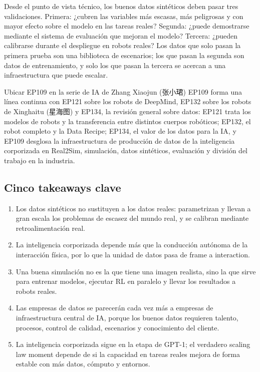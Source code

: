 \documentclass[a4paper]{article}
\begin{document}
Desde el punto de vista técnico, los buenos datos sintéticos deben pasar tres validaciones. Primera: ¿cubren las variables más escasas, más peligrosas y con mayor efecto sobre el modelo en las tareas reales? Segunda: ¿puede demostrarse mediante el sistema de evaluación que mejoran el modelo? Tercera: ¿pueden calibrarse durante el despliegue en robots reales? Los datos que solo pasan la primera prueba son una biblioteca de escenarios; los que pasan la segunda son datos de entrenamiento, y solo los que pasan la tercera se acercan a una infraestructura que puede escalar.

\begin{importantbox}{Ubicar EP109 en la serie de IA de Zhang Xiaojun (张小珺)}
EP109 forma una línea continua con EP121 sobre los robots de DeepMind, EP132 sobre los robots de Xinghaitu (星海图) y EP134, la revisión general sobre datos: EP121 trata los modelos de robots y la transferencia entre distintos cuerpos robóticos; EP132, el robot completo y la Data Recipe; EP134, el valor de los datos para la IA, y EP109 desglosa la infraestructura de producción de datos de la inteligencia corporizada en Real2Sim, simulación, datos sintéticos, evaluación y división del trabajo en la industria.
\end{importantbox}

\subsection{Cinco takeaways clave}

\begin{enumerate}
\item Los datos sintéticos no sustituyen a los datos reales: parametrizan y llevan a gran escala los problemas de escasez del mundo real, y se calibran mediante retroalimentación real.
\item La inteligencia corporizada depende más que la conducción autónoma de la interacción física, por lo que la unidad de datos pasa de frame a interaction.
\item Una buena simulación no es la que tiene una imagen realista, sino la que sirve para entrenar modelos, ejecutar RL en paralelo y llevar los resultados a robots reales.
\item Las empresas de datos se parecerán cada vez más a empresas de infraestructura central de IA, porque los buenos datos requieren talento, procesos, control de calidad, escenarios y conocimiento del cliente.
\item La inteligencia corporizada sigue en la etapa de GPT-1; el verdadero scaling law moment depende de si la capacidad en tareas reales mejora de forma estable con más datos, cómputo y entornos.
\end{enumerate}
\end{document}
